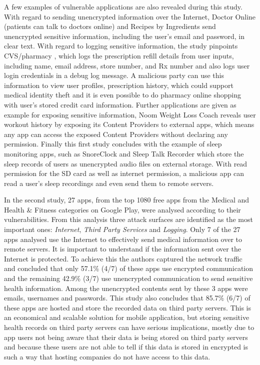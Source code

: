 A few examples of vulnerable applications are also revealed during this study. With regard to sending unencrypted information over the Internet, Doctor Online \cite{doctoronline} (patients can talk to doctors online) and Recipes by Ingredients \cite{recipesbyingredients} send unencrypted sensitive information, including the user's email and password, in clear text. With regard to logging sensitive information, the study pinpoints CVS/pharmacy \cite{cvspharmacy}, which logs the prescription refill details from user inputs, including name, email address, store number, and Rx number and also logs user login credentials in a debug log message. A malicious party can use this information to view user profiles, prescription history, which could support medical identity theft and it is even possible to do pharmacy online shopping with user's stored credit card information. Further applications are given as example for exposing sensitive information, Noom Weight Loss Coach \cite{noomwlc} reveals user workout history by exposing its Content Providers to external apps, which means any app can access the exposed Content Providers without declaring any permission. Finally this first study concludes with the example of sleep monitoring apps, such as SnoreClock \cite{snoreclock} and Sleep Talk Recorder \cite{sleeptalk} which store the sleep records of users as unencrypted audio files on external storage. With read permission for the SD card as well as internet permission, a malicious app can read a user's sleep recordings and even send them to remote servers.

In the second study, 27 apps, from the top 1080 free apps from the Medical and Health \& Fitness categories on Google Play, were analysed according to their vulnerabilities. From this analysis three attack surfaces are identified as the most important ones: \emph{Internet}, \emph{Third Party Services} and \emph{Logging}. Only 7 of the 27 apps analysed use the Internet to effectively send medical information over to remote servers. It is important to understand if the information sent over the Internet is protected. To achieve this the authors captured the network traffic and concluded that only 57.1\% (4/7) of these apps use encrypted communication and the remaining 42.9\% (3/7) use unencrypted communication to send sensitive health information. Among the unencrypted contents sent by these 3 apps were emails, usernames and passwords. This study also concludes that 85.7\% (6/7) of these apps are hosted and store the recorded data on third party servers. This is an economical and scalable solution for mobile application, but storing sensitive health records on third party servers can have serious implications, mostly due to app users not being aware that their data is being stored on third party servers and because these users are not able to tell if this data is stored in encrypted is such a way that hosting companies do not have access to this data.

